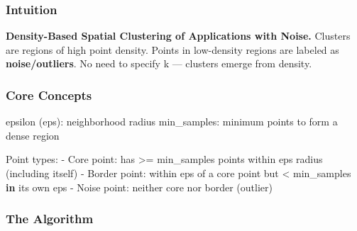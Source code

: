 \documentclass[11pt]{article}
\newenvironment{Shaded}{\begin{snugshade}}{\end{snugshade}}
\newcommand{\KeywordTok}[1]{\textcolor[rgb]{0.81,0.81,0.76}{\textbf{#1}}}
\newcommand{\NormalTok}[1]{\textcolor[rgb]{0.81,0.81,0.76}{#1}}
\newcommand{\OperatorTok}[1]{\textcolor[rgb]{0.81,0.81,0.76}{#1}}
\begin{document}
\subsubsection{Intuition}\label{intuition-10}

\textbf{Density-Based Spatial Clustering of Applications with Noise.} Clusters are regions of high point density. Points in low-density regions are labeled as \textbf{noise/outliers}. No need to specify k --- clusters emerge from density.

\subsubsection{Core Concepts}\label{core-concepts}


\begin{Shaded}
\begin{Highlighting}[]
\NormalTok{epsilon (eps): neighborhood radius}
\NormalTok{min\_samples: minimum points to form a dense region}

\NormalTok{Point types:}
\OperatorTok{{-}}\NormalTok{ Core point:    has }\OperatorTok{\textgreater{}=}\NormalTok{ min\_samples points within eps radius (including itself)}
\OperatorTok{{-}}\NormalTok{ Border point:  within eps of a core point but }\OperatorTok{\textless{}}\NormalTok{ min\_samples }\KeywordTok{in}\NormalTok{ its own eps}
\OperatorTok{{-}}\NormalTok{ Noise point:   neither core nor border (outlier)}
\end{Highlighting}
\end{Shaded}

\subsubsection{The Algorithm}\label{the-algorithm-1}

\end{document}
